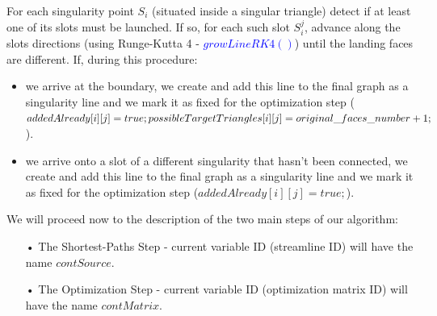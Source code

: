 \documentclass[a4paper]{report}
\begin{document}
{For each singularity point $S_i$ (situated inside a singular triangle) detect if at least one of its slots must be launched.
If so, for each such slot $S_i^j$, advance along the slots directions (using Runge-Kutta 4 - \textcolor{blue}{$growLineRK4()$}) until the landing faces are different.
\newline
If, during this procedure:
\newline
\begin{itemize}
\item we arrive at the boundary, we create and add this line to the final graph as a singularity line and we mark it as fixed for the optimization step (\textcolor{myGreen}{$addedAlready[i][j] =true;\newline possibleTargetTriangles[i][j] = original\_faces\_number + 1;$}). 
\item we arrive onto a slot of a different singularity that hasn't been connected, we create and add this line to the final graph as a singularity line and we mark it as fixed for the optimization step (\textcolor{myGreen}{$addedAlready[i][j] = true;$}). 

\end{itemize}

We will proceed now to the description of the two main steps of our algorithm:
\begin{itemize}
\item[•] The Shortest-Paths Step - current variable ID (streamline ID) will have the name \textcolor{myGreen}{$contSource$}.
\item[•] The Optimization Step - current variable ID (optimization matrix ID) will have the name \textcolor{myGreen}{$contMatrix$}.
\end{itemize}

\bigskip
}
\end{document}
